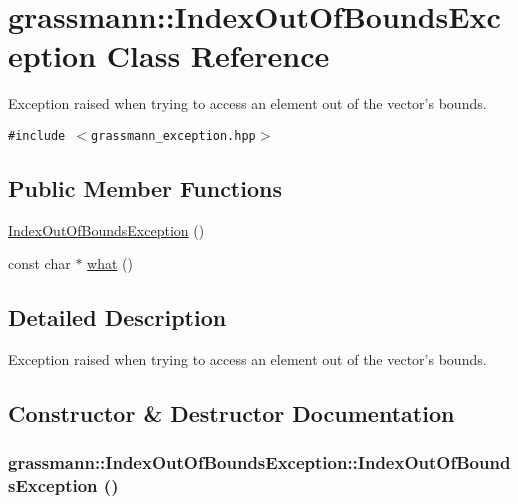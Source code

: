 \hypertarget{classgrassmann_1_1IndexOutOfBoundsException}{
\section{grassmann::IndexOutOfBoundsException Class Reference}
\label{classgrassmann_1_1IndexOutOfBoundsException}
}
Exception raised when trying to access an element out of the vector's bounds.  


{\tt \#include $<$grassmann\_\-exception.hpp$>$}

\subsection*{Public Member Functions}
\begin{CompactItemize}
\item 
\hyperlink{classgrassmann_1_1IndexOutOfBoundsException_0333d231d44e23620c6d58b238cc2781}{IndexOutOfBoundsException} ()
\item 
const char $\ast$ \hyperlink{classgrassmann_1_1IndexOutOfBoundsException_fbb51d7bba4ec6605cb069f53371f5fe}{what} ()
\end{CompactItemize}


\subsection{Detailed Description}
Exception raised when trying to access an element out of the vector's bounds. 

\subsection{Constructor \& Destructor Documentation}
\hypertarget{classgrassmann_1_1IndexOutOfBoundsException_0333d231d44e23620c6d58b238cc2781}{
\subsubsection[IndexOutOfBoundsException]{\setlength{\rightskip}{0pt plus 5cm}grassmann::IndexOutOfBoundsException::IndexOutOfBoundsException ()}}
\label{classgrassmann_1_1IndexOutOfBoundsException_0333d231d44e23620c6d58b238cc2781}




